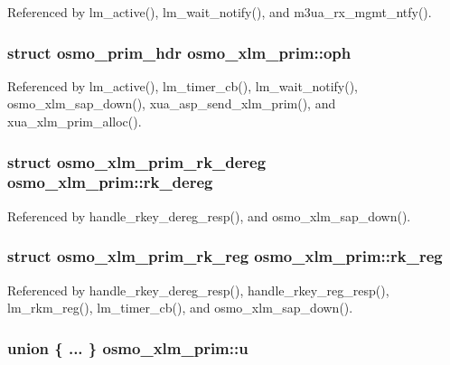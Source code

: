Referenced by lm\+\_\+active(), lm\+\_\+wait\+\_\+notify(), and m3ua\+\_\+rx\+\_\+mgmt\+\_\+ntfy().

\subsubsection[{oph}]{\setlength{\rightskip}{0pt plus 5cm}struct osmo\+\_\+prim\+\_\+hdr osmo\+\_\+xlm\+\_\+prim\+::oph}\label{structosmo__xlm__prim_a8ac40b9653c8b8c3feb1c72113932f4c}


Referenced by lm\+\_\+active(), lm\+\_\+timer\+\_\+cb(), lm\+\_\+wait\+\_\+notify(), osmo\+\_\+xlm\+\_\+sap\+\_\+down(), xua\+\_\+asp\+\_\+send\+\_\+xlm\+\_\+prim(), and xua\+\_\+xlm\+\_\+prim\+\_\+alloc().

\subsubsection[{rk\+\_\+dereg}]{\setlength{\rightskip}{0pt plus 5cm}struct {\bf osmo\+\_\+xlm\+\_\+prim\+\_\+rk\+\_\+dereg} osmo\+\_\+xlm\+\_\+prim\+::rk\+\_\+dereg}\label{structosmo__xlm__prim_a7a1f5039d36e215d60adc624548e60cd}


Referenced by handle\+\_\+rkey\+\_\+dereg\+\_\+resp(), and osmo\+\_\+xlm\+\_\+sap\+\_\+down().

\subsubsection[{rk\+\_\+reg}]{\setlength{\rightskip}{0pt plus 5cm}struct {\bf osmo\+\_\+xlm\+\_\+prim\+\_\+rk\+\_\+reg} osmo\+\_\+xlm\+\_\+prim\+::rk\+\_\+reg}\label{structosmo__xlm__prim_aa0cbd398953e690bfd6491814707e606}


Referenced by handle\+\_\+rkey\+\_\+dereg\+\_\+resp(), handle\+\_\+rkey\+\_\+reg\+\_\+resp(), lm\+\_\+rkm\+\_\+reg(), lm\+\_\+timer\+\_\+cb(), and osmo\+\_\+xlm\+\_\+sap\+\_\+down().

\subsubsection[{u}]{\setlength{\rightskip}{0pt plus 5cm}union \{ ... \}   osmo\+\_\+xlm\+\_\+prim\+::u}\label{structosmo__xlm__prim_ade4c1428612a2e7c1013fb729cc612a2}


